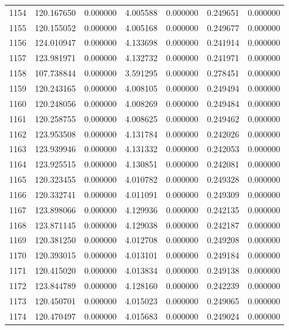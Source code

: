 \begin{tabular}{rrrrrrr}
1154 & 120.167650 &    0.000000 &  4.005588 &    0.000000 &    0.249651 &  0.000000 \\
1155 & 120.155052 &    0.000000 &  4.005168 &    0.000000 &    0.249677 &  0.000000 \\
1156 & 124.010947 &    0.000000 &  4.133698 &    0.000000 &    0.241914 &  0.000000 \\
1157 & 123.981971 &    0.000000 &  4.132732 &    0.000000 &    0.241971 &  0.000000 \\
1158 & 107.738844 &    0.000000 &  3.591295 &    0.000000 &    0.278451 &  0.000000 \\
1159 & 120.243165 &    0.000000 &  4.008105 &    0.000000 &    0.249494 &  0.000000 \\
1160 & 120.248056 &    0.000000 &  4.008269 &    0.000000 &    0.249484 &  0.000000 \\
1161 & 120.258755 &    0.000000 &  4.008625 &    0.000000 &    0.249462 &  0.000000 \\
1162 & 123.953508 &    0.000000 &  4.131784 &    0.000000 &    0.242026 &  0.000000 \\
1163 & 123.939946 &    0.000000 &  4.131332 &    0.000000 &    0.242053 &  0.000000 \\
1164 & 123.925515 &    0.000000 &  4.130851 &    0.000000 &    0.242081 &  0.000000 \\
1165 & 120.323455 &    0.000000 &  4.010782 &    0.000000 &    0.249328 &  0.000000 \\
1166 & 120.332741 &    0.000000 &  4.011091 &    0.000000 &    0.249309 &  0.000000 \\
1167 & 123.898066 &    0.000000 &  4.129936 &    0.000000 &    0.242135 &  0.000000 \\
1168 & 123.871145 &    0.000000 &  4.129038 &    0.000000 &    0.242187 &  0.000000 \\
1169 & 120.381250 &    0.000000 &  4.012708 &    0.000000 &    0.249208 &  0.000000 \\
1170 & 120.393015 &    0.000000 &  4.013101 &    0.000000 &    0.249184 &  0.000000 \\
1171 & 120.415020 &    0.000000 &  4.013834 &    0.000000 &    0.249138 &  0.000000 \\
1172 & 123.844789 &    0.000000 &  4.128160 &    0.000000 &    0.242239 &  0.000000 \\
1173 & 120.450701 &    0.000000 &  4.015023 &    0.000000 &    0.249065 &  0.000000 \\
1174 & 120.470497 &    0.000000 &  4.015683 &    0.000000 &    0.249024 &  0.000000 \\

\end{tabular}
